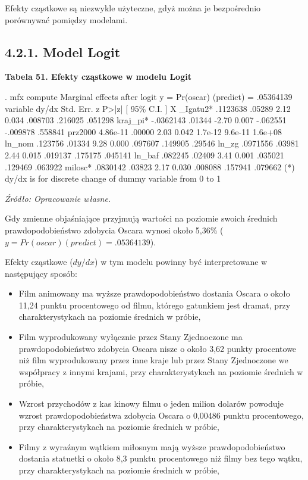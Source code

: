 Efekty cząstkowe są niezwykle użyteczne, gdyż można je bezpośrednio porównywać pomiędzy modelami.

\subsection*{4.2.1. Model Logit}

\vspace{0.3cm}
\textbf{Tabela 51. Efekty cząstkowe w modelu Logit}
\begin{stlog}
. mfx compute
Marginal effects after logit
      y  = Pr(oscar) (predict)
         =  .05364139
variable {\VBAR}      dy/dx    Std. Err.     z    P>|z|  [    95\% C.I.   ]      X
_Igatu{\tytilde}2*{\VBAR}   .1123638      .05289    2.12   0.034   .008703  .216025   .051298
kraj_p{\tytilde}i*{\VBAR}  -.0362143      .01344   -2.70   0.007  -.062551 -.009878   .558841
prz{\tytilde}2000 {\VBAR}   4.86e-11      .00000    2.03   0.042   1.7e-12  9.6e-11   1.6e+08
  ln_nom {\VBAR}    .123756      .01334    9.28   0.000   .097607  .149905    .29546
   ln_zg {\VBAR}   .0971556      .03981    2.44   0.015   .019137  .175175   .045141
  ln_baf {\VBAR}    .082245      .02409    3.41   0.001   .035021  .129469   .063922
  milosc*{\VBAR}   .0830142      .03823    2.17   0.030   .008088  .157941   .079662
(*) dy/dx is for discrete change of dummy variable from 0 to 1
\end{stlog}
\textit{\footnotesize{Źródło: Opracowanie własne.}} \\
\vspace{0.5cm}

Gdy zmienne objaśniające przyjmują wartości na poziomie swoich średnich prawdopodobieństwo zdobycia Oscara wynosi około 5,36\% ($y = Pr(oscar)(predict) = .05364139$).

Efekty cząstkowe ($dy/dx$) w tym modelu powinny być interpretowane w następujący sposób:

\begin{itemize}
\item Film animowany ma wyższe prawdopodobieństwo dostania Oscara o około 11,24 punktu procentowego od filmu, którego gatunkiem jest dramat, przy charakterystykach na poziomie średnich w próbie,
\item Film wyprodukowany wyłącznie przez Stany Zjednoczone ma prawdopodobieństwo zdobycia Oscara nisze o około 3,62 punkty procentowe niż film wyprodukowany przez inne kraje lub przez Stany Zjednoczone we współpracy z innymi krajami, przy charakterystykach na poziomie średnich w próbie,
\item Wzrost przychodów  z kas kinowy filmu o jeden milion dolarów powoduje wzrost prawdopodobieństwa zdobycia Oscara o 0,00486 punktu procentowego, przy charakterystykach na poziomie średnich w próbie,
\item Filmy z wyraźnym wątkiem miłosnym mają wyższe prawdopodobieństwo dostania statuetki o około 8,3 punktu procentowego niż filmy bez tego wątku, przy charakterystykach na poziomie średnich w próbie,
\end{itemize}

